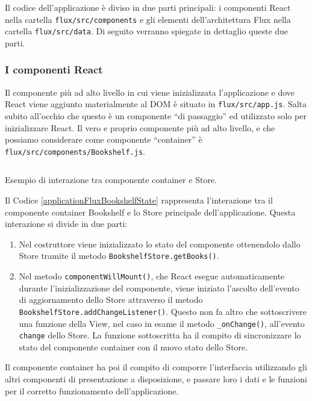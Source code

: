Il codice dell'applicazione è diviso in due parti principali: i componenti React nella cartella \texttt{flux/src/components} e gli elementi dell'architettura Flux nella cartella \texttt{flux/src/data}. Di seguito verranno spiegate in dettaglio queste due parti.

\subsubsection*{I componenti React}
Il componente più ad alto livello in cui viene inizializzata l'applicazione e dove React viene aggiunto materialmente al DOM è situato in \texttt{flux/src/app.js}. Salta subito all'occhio che questo è un componente “di passaggio” ed utilizzato solo per inizializzare React. Il vero e proprio componente più ad alto livello, e che possiamo considerare come componente “container” è \texttt{flux/src/components/Bookshelf.js}.

\begin{listing}[ht]
\inputminted{javascript}{sources/applicationFluxBookshelfState.js}
\caption{Esempio di interazione tra componente container e Store.} 
\label{applicationFluxBookshelfState} 
\end{listing} 

Il Codice \ref{applicationFluxBookshelfState} rappresenta l'interazione tra il componente container Bookshelf e lo Store principale dell'applicazione. Questa interazione si divide in due parti: 

\begin{enumerate}
    \item Nel costruttore viene inizializzato lo stato del componente ottenendolo dallo Store tramite il metodo \texttt{BookshelfStore.getBooks()}.

    \item Nel metodo \texttt{componentWillMount()}, che React esegue automaticamente durante l'inizializzazione del componente, viene iniziato l'ascolto dell'evento di aggiornamento dello Store attraverso il metodo \texttt{BookshelfStore.addChangeListener()}. Questo non fa altro che sottoscrivere una funzione della View, nel caso in esame il metodo \texttt{_onChange()}, all'evento \texttt{change} dello Store. La funzione sottoscritta ha il compito di sincronizzare lo stato del componente container con il nuovo stato dello Store.
\end{enumerate}

Il componente container ha poi il compito di comporre l'interfaccia utilizzando gli altri componenti di presentazione a disposizione, e passare loro i dati e le funzioni per il corretto funzionamento dell'applicazione.

